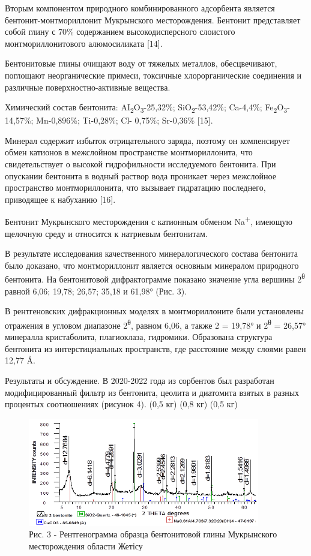 \begin{multicols}{2}
Вторым компонентом природного комбинированного адсорбента является
бентонит-монтмориллонит Мукрынского месторождения. Бентонит представляет
собой глину с 70\% содержанием высокодисперсного слоистого
монтмориллонитового алюмосиликата {[}14{]}.

Бентонитовые глины очищают воду от тяжелых металлов, обесцвечивают,
поглощают неорганические примеси, токсичные хлорорганические соединения
и различные поверхностно-активные вещества.

Химический состав бентонита:
AI\textsubscript{2}O\textsubscript{3}-25,32\%;
SiO\textsubscript{2}-53,42\%; Ca-4,4\%;
Fe\textsubscript{2}O\textsubscript{3}-14,57\%; Mn-0,896\%; Ti-0,28\%;
Cl- 0,75\%; Sr-0,36\% {[}15{]}.

Минерал содержит избыток отрицательного заряда, поэтому он компенсирует
обмен катионов в межслойном пространстве монтмориллонита, что
свидетельствует о высокой гидрофильности исследуемого бентонита. При
опускании бентонита в водный раствор вода проникает через межслойное
пространство монтмориллонита, что вызывает гидратацию последнего,
приводящее к набуханию {[}16{]}.

Бентонит Мукрынского месторождения с катионным обменом
Na\textsuperscript{+}, имеющую щелочную среду и относится к натриевым
бентонитам.

В результате исследования качественного минералогического состава
бентонита было доказано, что монтмориллонит является основным минералом
природного бентонита. На бентонитовой дифрактограмме показано значение
угла вершины 2\textsuperscript{θ} равной 6,06; 19,78; 26,57; 35,18 и
61,98° (Рис. 3).

В рентгеновских дифракционных моделях в монтмориллоните были установлены
отражения в угловом диапазоне 2\textsuperscript{θ}, равном 6,06, а также
2 = 19,78° и 2\textsuperscript{θ} = 26,57° минералла кристаболита,
плагиоклаза, гидромики. Образована структура бентонита из
интерстициальных пространств, где расстояние между слоями равен 12,77 Å.

Результаты и обсуждение. В 2020-2022 года из сорбентов был разработан
модифицированный фильтр из бентонита, цеолита и диатомита взятых в
разных процентых соотношениях (рисунок 4). (0,5 кг) (0,8 кг) (0,5 кг)
\end{multicols}

\begin{figure}[H]
	\centering
	\includegraphics[width=0.9\textwidth]{media/chem/image3}
	\caption*{Рис. 3 - Рентгенограмма образца бентонитовой глины Мукрынского
месторождения области Жетісу}
\end{figure}

